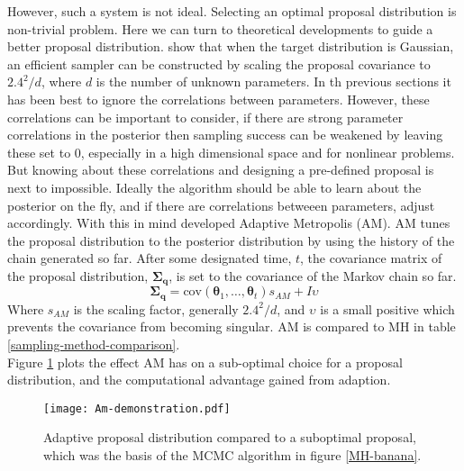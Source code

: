 However, such a system is not ideal. Selecting an optimal proposal distribution is non-trivial problem. Here we can turn to theoretical developments to guide a better proposal distribution. \citet{gelman1996} show that when the target distribution is Gaussian, an efficient sampler can be constructed by scaling the proposal covariance to $2.4^2/d$, where $d$ is the number of unknown parameters. In th previous sections it has been best to ignore the correlations between parameters. However, these correlations can be important to consider, if there are strong parameter correlations in the posterior then sampling success can be weakened by leaving these set to 0, especially in a high dimensional space and for nonlinear problems. But knowing about these correlations and designing a pre-defined proposal is next to impossible. Ideally the algorithm should be able to learn about the posterior on the fly, and if there are correlations betweeen parameters, adjust accordingly. With this in mind \citet{haario2001} developed Adaptive Metropolis (AM). AM tunes the proposal distribution to the posterior distribution by using the history of the chain generated so far. After some designated time, $t$, the covariance matrix of the proposal distribution, $\bm{\Sigma_q}$, is set to the covariance of the Markov chain so far. 
\begin{equation}
\bm{\Sigma_q} = \text{cov}(\bm{\theta}_1,\dots,\bm{\theta}_t)s_{AM} + I\upsilon
\end{equation}
Where $s_{AM}$ is the scaling factor, generally $2.4^2/d$, and $\upsilon$ is a small positive which prevents the covariance from becoming singular. AM is compared to MH in table \ref{sampling-method-comparison}.\\

Figure \ref{AM-demonstration} plots the effect AM has on a sub-optimal choice for a proposal distribution, and the computational advantage gained from adaption. \\

\begin{figure}[H]
	\centering
	\texttt{[image: Am-demonstration.pdf]}
	\caption{Adaptive proposal distribution compared to a suboptimal proposal, which was the basis of the MCMC algorithm in figure \ref{MH-banana}.}
	\label{AM-demonstration}
\end{figure}

